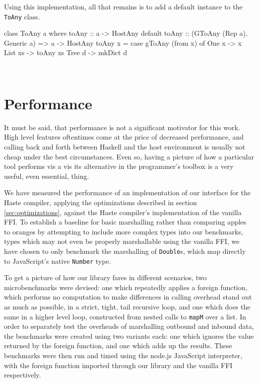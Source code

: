\documentclass{sigplanconf}
\begin{document}
Using this implementation, all that remains is to add a default instance to
the \lstinline!ToAny! class.\\
\begin{code}
  class ToAny a where
    toAny :: a -> HostAny
    default toAny :: (GToAny (Rep a), Generic a)
                  => a -> HostAny
    toAny x =
      case gToAny (from x) of
        One x   -> x
        List xs -> toAny xs
        Tree d  -> mkDict d
\end{code}\\
\section{Performance}
\label{sec:performance}
It must be said, that performance is not a significant motivator for this work.
High level features oftentimes come at the price of decreased performance,
and calling back and forth between Haskell and the host environment is usually
not cheap under the best circumstances.
Even so, having a picture of how a particular tool performs vis a vis its
alternative in the programmer's toolbox is a very useful, even essential,
thing.

We have measured the performance of an implementation of our interface for the
Haste compiler, applying the optimizations described in section
\ref{sec:optimizations}, against the Haste compiler's implementation of the
vanilla FFI. To establish a baseline for basic marshalling rather than
comparing apples to oranges by attempting to include more complex types
into our benchmarks, types which may not even be properly marshallable using
the vanilla FFI, we have chosen to only benchmark the marshalling of
\lstinline!Double!s, which map directly to JavaScript's native
\lstinline!Number! type.

To get a picture of how our library fares in different scenarios,
two microbenchmarks were devised: one which repeatedly applies a foreign
function, which performs no computation to make differences in
calling overhead stand out as much as possible, in a strict, tight, tail
recursive loop, and one which does the same in a higher level loop,
constructed from nested calls to \lstinline!mapM! over a list.
In order to separately
test the overheads of marshalling outbound and inbound data, the benchmarks
were created using two variants each: one which ignores the value returned
by the foreign function, and one which adds up the results.
These benchmarks were then run and timed
using the node.js JavaScript interpreter, with the foreign function imported
through our library and the vanilla FFI respectively.
\end{document}
